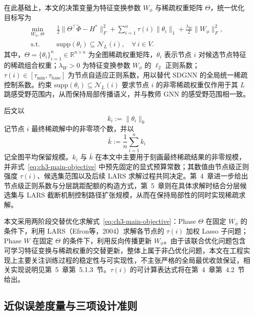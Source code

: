 在此基础上，本文的决策变量为特征变换参数 $W_\phi$ 与稀疏权重矩阵 $\Theta$，统一优化目标写为
\begin{equation}
  \begin{aligned}
    \min_{W_\phi,\,\Theta}\quad &
    \frac{1}{2}\|\Theta^\top\tilde{\Phi}-H^*\|_F^2
    + \sum_{i=1}^n \tau(i)\|\theta_i\|_1
    + \frac{\lambda_W}{2}\|W_\phi\|_F^2, \\
    \mathrm{s.t.}\quad &
    \mathrm{supp}(\theta_i) \subseteq \mathcal{N}_L(i),\quad \forall\, i\in V.
  \end{aligned}
  \label{eq:ch3-main-objective}
\end{equation}
其中，$\Theta=\{\theta_i\}_{i=1}^{n}\in\mathbb{R}^{n\times n}$ 为全图稀疏权重矩阵，$\theta_i$ 表示节点 $i$ 对候选节点特征的稀疏组合权重；$\lambda_W>0$ 为特征变换参数 $W_\phi$ 的 $\ell_2$ 正则系数；$\tau(i)\in[\tau_{\min},\tau_{\mathrm{base}}]$ 为节点自适应正则系数，用以替代 SDGNN 的全局统一稀疏控制系数。约束 $\mathrm{supp}(\theta_i)\subseteq\mathcal{N}_L(i)$ 要求节点 $i$ 的非零稀疏权重仅作用于其 $L$ 跳感受野范围内，从而保持局部传播语义，并与教师 GNN 的感受野范围相一致。

后文以
\begin{equation}
  k_i:=\|\theta_i\|_0
  \label{eq:ch3-node-sparse-size}
\end{equation}
记节点 $i$ 最终稀疏解中的非零项个数，并以
\begin{equation}
  \bar{k}:=\frac{1}{n}\sum_{i=1}^{n}k_i
  \label{eq:ch3-kbar}
\end{equation}
记全图平均保留规模。$k_i$ 与 $\bar{k}$ 在本文中主要用于刻画最终稀疏结果的非零规模，并非式~\eqref{eq:ch3-main-objective} 中预先固定的显式预算常数；其数值由节点级正则强度 $\tau(i)$、候选集范围以及后续 LARS 求解过程共同决定。第~4~章进一步给出节点级正则系数与分层跳距配额的构造方式，第~5~章则在具体求解时结合分层候选集与 LARS 截断机制控制路径扩张规模，从而在保持局部性的同时实现稀疏求解。
\label{idx:theme:lars}

本文采用两阶段交替优化求解式~\eqref{eq:ch3-main-objective}：Phase $\Theta$ 在固定 $W_\phi$ 的条件下，利用 LARS\cite{Efron2004LARS}（Efron等，2004）求解各节点的 $\tau(i)$ 加权 Lasso 子问题；Phase $W$ 在固定 $\Theta$ 的条件下，利用反向传播更新 $W_\phi$。由于该联合优化问题包含可学习特征变换与稀疏权重的交替更新，整体上属于非凸优化问题，本文在工程实现上主要关注训练过程的稳定性与可实现性，不主张严格的全局最优收敛保证，相关实现说明见第~5~章第~5.1.3~节。$\tau(i)$ 的可计算表达式将在第~4~章第~4.2~节给出。

\subsection{近似误差度量与三项设计准则}
\label{subsec:ch3-criteria}

